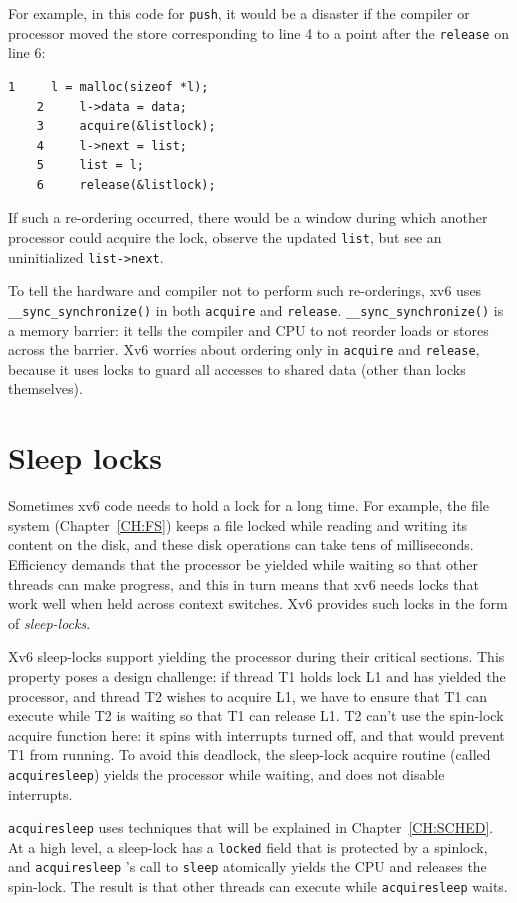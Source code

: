 For example, in this code for
\lstinline{push},
it would be a disaster if the compiler or processor moved the
store corresponding to
line 4 to a point after the
\lstinline{release}
on line 6:
\begin{lstlisting}[]
    1	  l = malloc(sizeof *l);
    2	  l->data = data;
    3	  acquire(&listlock);
    4	  l->next = list;
    5	  list = l;
    6	  release(&listlock);
\end{lstlisting}
If such a re-ordering occurred, there would be a window during
which another processor could acquire the lock,
observe the updated
\lstinline{list},
but see an uninitialized
\lstinline{list->next}.

To tell the hardware and compiler not to perform such re-orderings,
xv6 uses
\lstinline{__sync_synchronize()} 
in both
\lstinline{acquire}
and
\lstinline{release}.
\lstinline{__sync_synchronize()}
is a memory barrier:
it tells the compiler and CPU to not reorder loads or stores across the
barrier.
Xv6 worries about ordering only in
\lstinline{acquire}
and
\lstinline{release},
because it uses locks to guard all accesses to shared data (other than locks
themselves).
\section{Sleep locks}

Sometimes xv6 code needs to hold a lock for a long time. For example,
the file system (Chapter~\ref{CH:FS}) keeps a file locked while reading
and writing its content on the disk, and these disk operations can
take tens of milliseconds. Efficiency demands that the processor be
yielded while waiting so that other threads can make
progress, and this in turn means that xv6 needs locks that 
work well when held across context switches.
Xv6 provides such locks in the form of
\textit{sleep-locks}.

Xv6 sleep-locks support yielding the processor during their critical
sections. This property poses a design challenge: if thread T1 holds
lock L1 and has yielded the processor, and thread T2 wishes to acquire
L1, we have to ensure that T1 can execute while T2 is waiting so
that T1 can release L1. T2 can't use the spin-lock acquire
function here: it
spins with interrupts turned off, and that would prevent T1
from running. To avoid this deadlock, the sleep-lock acquire
routine
(called
\lstinline{acquiresleep})
yields the processor while waiting, and does not disable
interrupts.

\lstinline{acquiresleep}
uses techniques that will be explained in
Chapter~\ref{CH:SCHED}.
At a high level, a sleep-lock has a
\lstinline{locked}
field that is protected by a spinlock, and 
\lstinline{acquiresleep} 's
call to
\lstinline{sleep}
atomically yields the CPU and releases the spin-lock.
The result is that other threads can execute while
\lstinline{acquiresleep}
waits.

